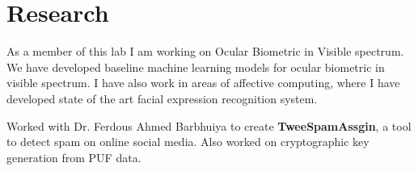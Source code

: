 
\section{Research}
As a member of this lab I am working on Ocular Biometric in Visible spectrum. We have developed baseline machine learning models for ocular biometric in visible spectrum. I have also work in areas of affective computing, where I have developed state of the art facial expression recognition system.
\sectionsep

Worked with Dr. Ferdous Ahmed Barbhuiya to create \textbf{TweeSpamAssgin}, a tool to detect spam on online social media. Also worked on cryptographic key generation from PUF data.
\sectionsep